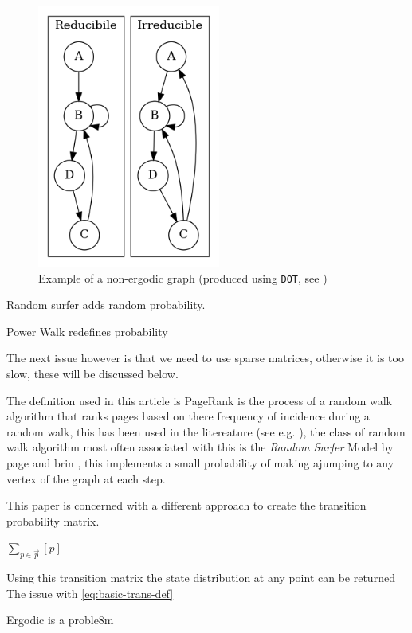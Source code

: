 \documentclass[11pt]{article}
\begin{document}
\begin{figure}[htbp]
\centering
\includegraphics[width=6cm]{media/dot/reducible_graph_example.dot.png}
\caption{\label{irreducible-example}Example of a non-ergodic graph (produced using \texttt{DOT}, see \cite{DOTLanguage,DOTGraphDescription2020})}
\end{figure}


Random surfer adds random probability.

Power Walk redefines probability

The next issue however is that we need to use sparse matrices, otherwise it is too slow, these will be discussed below.




The definition used in this article is PageRank is the process of a random walk algorithm that ranks pages based on there frequency of incidence during a random walk, this has been used in the litereature (see e.g. \cite[]{guptaWTFWhoFollow2013}), the class of random walk algorithm most often associated with this is the \emph{Random Surfer} Model by page and brin \cite{larrypageAnatomyLargescaleHypertextual1998}, this implements a small probability of making ajumping to any vertex of the graph at each step.

This paper is concerned with a different approach to create the transition probability matrix.



\(\sum_{p\in \vec{p}} \left[ p \right]\)

Using this transition matrix the state distribution at any point can be returned
The issue with \eqref{eq:basic-trans-def}

Ergodic is a proble8m
\end{document}

